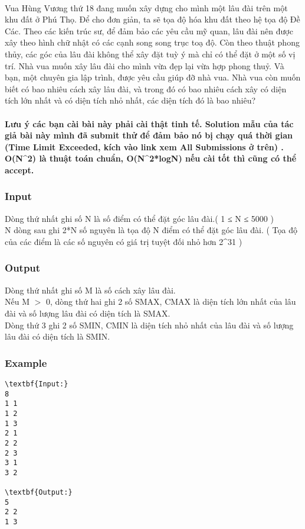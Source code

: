 

 

Vua Hùng Vương thứ 18 đang muốn xây dựng cho mình một lâu đài trên một khu đất ở Phú Thọ. Để cho đơn giản, ta sẽ tọa độ hóa khu đất theo hệ tọa độ Đề Các. Theo các kiến trúc sư, để đảm bảo các yêu cầu mỹ quan, lâu đài nên được xây theo hình chữ nhật có các cạnh song song trục toạ độ. Còn theo thuật phong thủy, các góc của lâu đài không thể xây đặt tuỳ ý mà chỉ có thể đặt ở một số vị trí. Nhà vua muốn xây lâu đài cho mình vừa đẹp lại vừa hợp phong thuỷ. Và bạn, một chuyên gia lập trình, được yêu cầu giúp đỡ nhà vua. Nhà vua còn muốn biết có bao nhiêu cách xây lâu đài, và trong đó có bao nhiêu cách xây có diện tích lớn nhất và có diện tích nhỏ nhất, các diện tích đó là bao nhiêu?

\paragraph{Lưu ý các bạn cài bài này phải cài thật tinh tế. Solution mẫu của tác giả bài này mình đã submit thử để đảm bảo nó bị chạy quá thời gian (Time Limit Exceeded, kích vào link xem All Submissions ở trên) . O(N^2) là thuật toán chuẩn, O(N^2*logN) nếu cài tốt thì cũng có thể accept.}

\subsubsection{Input}

Dòng thứ nhất ghi số N là số điểm có thể đặt góc lâu đài.( 1 ≤ N ≤ 5000 )
\\N dòng sau ghi 2*N số nguyên là tọa độ N điểm có thể đặt góc lâu đài. ( Tọa độ của các điểm là các số nguyên có giá trị tuyệt đối nhỏ hơn 2^31 )

\subsubsection{Output}

Dòng thứ nhất ghi số M là số cách xây lâu đài.
\\Nếu M $>$ 0, dòng thứ hai ghi 2 số SMAX, CMAX là diện tích lớn nhất của lâu đài và số lượng lâu đài có diện tích là SMAX.
\\Dòng thứ 3 ghi 2 số SMIN, CMIN là diện tích nhỏ nhất của lâu đài và số lượng lâu đài có diện tích là SMIN.

\subsubsection{Example}
\begin{verbatim}
\textbf{Input:}
8
1 1
1 2
1 3
2 1
2 2
2 3
3 1
3 2

\textbf{Output:}
5
2 2
1 3

\end{verbatim}
